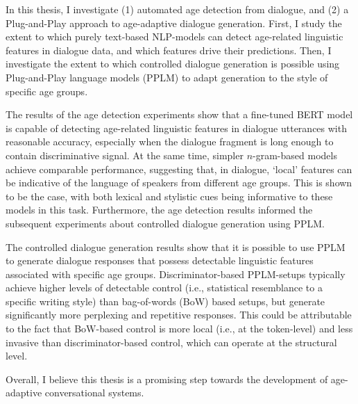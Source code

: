 
In this thesis, I investigate (1) automated age detection from dialogue, and (2) a Plug-and-Play approach to age-adaptive dialogue generation. First, I study the extent to which purely text-based NLP-models can detect age-related linguistic features in dialogue data, and which features drive their predictions. Then, I investigate the extent to which controlled dialogue generation is possible using Plug-and-Play language models (PPLM) \citep{dathathri2019plug} to adapt generation to the style of specific age groups.

The results of the age detection experiments show that a fine-tuned BERT model is capable of detecting age-related linguistic features in dialogue utterances with reasonable accuracy, especially when the dialogue fragment is long enough to contain discriminative signal. At the same time, simpler $n$-gram-based models achieve comparable performance, suggesting that, in dialogue, ‘local’ features can be indicative of the language of speakers from different age groups. This is shown to be the case, with both lexical and stylistic cues being informative to these models in this task. Furthermore, the age detection results informed the subsequent experiments about controlled dialogue generation using PPLM.

The controlled dialogue generation results show that it is possible to use PPLM to generate dialogue responses that possess detectable linguistic features associated with specific age groups. Discriminator-based PPLM-setups typically achieve higher levels of detectable control (i.e., statistical resemblance to a specific writing style) than bag-of-words (BoW) based setups, but generate significantly more perplexing and repetitive responses. This could be attributable to the fact that BoW-based control is more local (i.e., at the token-level) and less invasive than discriminator-based control, which can operate at the structural level.

Overall, I believe this thesis is a promising step towards the development of age-adaptive conversational systems.